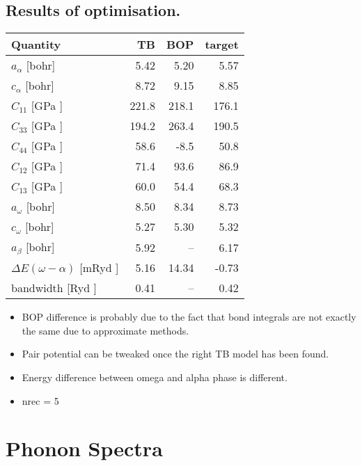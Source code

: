 \documentclass[11pt]{article}
\begin{document}
\subsection*{Results of optimisation.}
\label{sec:org9b1b452}
\begin{center}
\begin{tabular}{lrrr}
\hline
Quantity & TB & BOP & target\\
\hline
\(a_{\alpha}\)              [bohr] & 5.42 & 5.20 & 5.57\\
\(c_{\alpha}\)              [bohr] & 8.72 & 9.15 & 8.85\\
\(C_{11}\)                  [GPa ] & 221.8 & 218.1 & 176.1\\
\(C_{33}\)                  [GPa ] & 194.2 & 263.4 & 190.5\\
\(C_{44}\)                  [GPa ] & 58.6 & -8.5 & 50.8\\
\(C_{12}\)                  [GPa ] & 71.4 & 93.6 & 86.9\\
\(C_{13}\)                  [GPa ] & 60.0 & 54.4 & 68.3\\
\(a_{\omega}\)              [bohr] & 8.50 & 8.34 & 8.73\\
\(c_{\omega}\)              [bohr] & 5.27 & 5.30 & 5.32\\
\(a_{\beta}\)               [bohr] & 5.92 & -- & 6.17\\
\(\Delta E(\omega-\alpha)\) [mRyd ] & 5.16 & 14.34 & -0.73\\
bandwidth                 [Ryd ] & 0.41 & -- & 0.42\\
\hline
\end{tabular}
\end{center}


\begin{notes}


\begin{itemize}
\item BOP difference is probably due to the fact that bond integrals are not
exactly the same due to approximate methods.
\item Pair potential can be tweaked once the right TB model has been found.
\item Energy difference between omega and alpha phase is different.
\item nrec = 5
\end{itemize}
\end{notes}

\section*{Phonon Spectra}
\label{sec:org8cf24c2}
\end{document}
